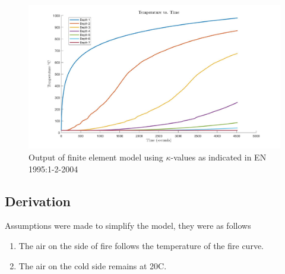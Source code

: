 \begin{figure}[H]
	\label{og_modeldata}
	\centering
	\includegraphics[width=\linewidth,]{figures/originalmugraph.jpg}
	\caption{Output of finite element model using $\kappa$-values as indicated in EN 1995:1-2-2004}
\end{figure}	

	\subsection{Derivation}%
	
	Assumptions were made to simplify the model, they were as follows
	\begin{enumerate}
\item{The air on the side of fire follows the temperature of the fire curve.}
\item{The air on the cold side remains at 20\textdegree C.}
	\end{enumerate}
